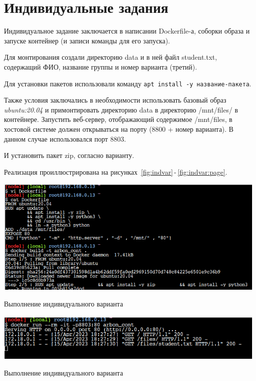 \section{Индивидуальные задания}
Индивидуальное задание заключается в написании Dockerfile-а,
соборки образа и запуске контейнер
(и записи команды для его запуска).\par
Для монтирования создали директорию data и в ней файл student.txt,
содержащий ФИО, название группы и номер варианта (третий).\par
Для установки пакетов использовали команду
\texttt{apt install -y название-пакета}.\par
Также условия заключались в необходимости использовать
базовый образ \textit{ubuntu:20.04}
и примонтировать директорию data в директорию /mnt/files/ в контейнере.
Запустить веб-сервер, отображающий содержимое /mnt/files, в хостовой
системе должен открываться на порту (8800 + номер варианта).
В данном случае использовался порт 8803.\par
И установить пакет zip, согласно варианту.\par
Реализация проиллюстрирована
на рисунках~\ref{fig:indvar}\,-\,\ref{fig:indvar:page}.

\begin{image}
	\includegraphics[width=1\textwidth]{Screenshot from 2023-04-15 21-24-51}
	\caption{Выполнение индивидуального варианта}
	\label{fig:indvar}
\end{image}

\begin{image}
	\includegraphics[width=1\textwidth]{Screenshot from 2023-04-15 21-27-55}
	\caption{Выполнение индивидуального варианта}
	\label{fig:indvar:run}
\end{image}

